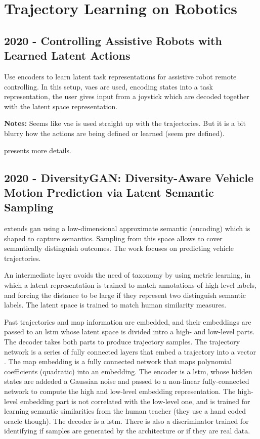 \section{Trajectory Learning on Robotics}\label{sec: traj learning robotics}

\subsection*{2020 - Controlling Assistive Robots with Learned Latent Actions}

\cite{losey2020controlling} Use encoders to learn latent task representations for assistive robot remote controlling. In this setup, \glspl{vae} are used, encoding states into a task representation, the user gives input from a joystick which are decoded together with the latent space representation.

\textbf{Notes:} Seems like \gls{vae} is used straight up with the trajectories. But it is a bit blurry how the actions are being defined or learned (seem pre defined).

\cite{losey2022learning} presents more details.

\subsection*{2020 - DiversityGAN: Diversity-Aware Vehicle Motion Prediction via Latent Semantic Sampling}

\cite{huang2020diversitygan} extends \gls{gan} using a low-dimensional approximate semantic (encoding) which is shaped to capture semantics. Sampling from this space allows to cover semantically distinguish outcomes. The work focuses on predicting vehicle trajectories.

An intermediate layer avoids the need of taxonomy  by using metric learning, in which a latent representation is trained to match annotations of high-level labels, and forcing the distance to be large if they represent two distinguish semantic labels.
%
The latent space is trained to match human similarity measures.

Past trajectories and map information are embedded, and their embeddings are passed to an \gls{lstm} whose latent space is divided intro a high- and low-level parts. The decoder takes both parts to produce trajectory samples.
%
The trajectory network is a series of fully connected layers that embed a trajectory into a vector \cite{alahi2016social} .
%
The map embedding is a fully connected network that maps polynomial coefficients (quadratic) into an embedding.
%
The encoder is a \gls{lstm}, whose hidden states are addeded a Gaussian noise and passed to a non-linear fully-connected network to compute the high and low-level embedding representation. The high-level embedding part is not correlated with the low-level one, and is trained for learning semantic similarities from the human teacher (they use a hand coded oracle though).
%
The decoder is a \gls{lstm}.
%
There is also a discriminator trained for identifying if samples are generated by the architecture or if they are real data.

